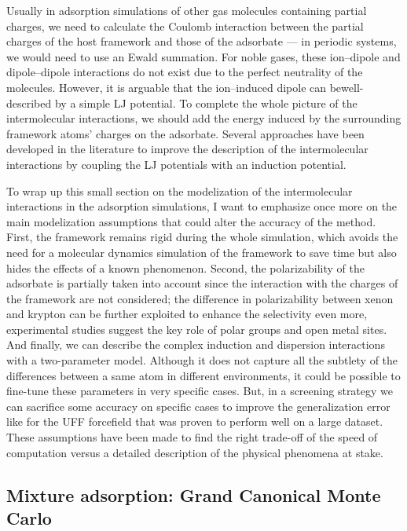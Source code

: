 \documentclass[main.tex]{subfiles}
\begin{document}
Usually in adsorption simulations of other gas molecules containing partial charges, we need to calculate the Coulomb interaction between the partial charges of the host framework and those of the adsorbate --- in periodic systems, we would need to use an Ewald summation. For noble gases, these ion--dipole and dipole--dipole interactions do not exist due to the perfect neutrality of the molecules. However, it is arguable that the ion--induced dipole  can bewell-described by a simple LJ potential. To complete the whole picture of the intermolecular interactions, we should add the energy induced by the surrounding framework atoms’ charges on the adsorbate. Several approaches have been developed in the literature to improve the description of the intermolecular interactions by coupling the LJ potentials with an induction potential.\autocite{Lachet_1998,Becker_2017} 

To wrap up this small section on the modelization of the intermolecular interactions in the adsorption simulations, I want to emphasize once more on the main modelization assumptions that could alter the accuracy of the method. First, the framework remains rigid during the whole simulation, which avoids the need for a molecular dynamics simulation of the framework to save time but also hides the effects of a known phenomenon.\autocite{Witman_2017} Second, the polarizability of the adsorbate is partially taken into account since the interaction with the charges of the framework are not considered; the difference in polarizability between xenon and krypton can be further exploited to enhance the selectivity even more, experimental studies suggest the key role of polar groups and open metal sites.\autocite{Li_2019,Pei_2022,Perry_2014} And finally, we can describe the complex induction and dispersion interactions with a two-parameter model. Although it does not capture all the subtlety of the differences between a same atom in different environments, it could be possible to fine-tune these parameters in very specific cases. But, in a screening strategy we can sacrifice some accuracy on specific cases to improve the generalization error like for the UFF forcefield that was proven to perform well on a large dataset.\autocite{McDaniel_2015}
These assumptions have been made to find the right trade-off of the speed of computation versus a detailed description of the physical phenomena at stake. 


\subsection{Mixture adsorption: Grand Canonical Monte Carlo}\label{sct:GCMC}
\end{document}
